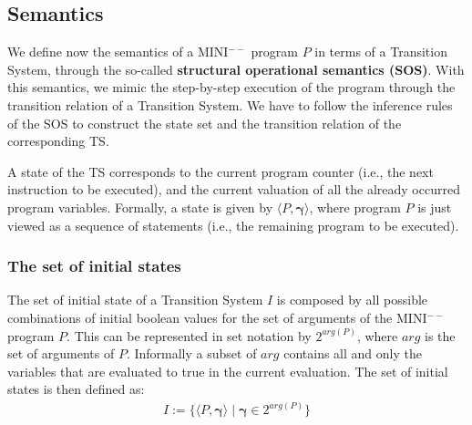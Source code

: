 \documentclass{article}
\begin{document}
\subsection{Semantics}
We define now the semantics of a MINI$^{--}$ program $P$ in terms of a Transition System, through the so-called \textbf{structural operational semantics (SOS)}. With this semantics, we mimic the step-by-step execution of the program through the transition relation of a Transition System. We have to follow the inference rules of the SOS to construct the state set and the transition relation of the corresponding TS.

A state of the TS corresponds to the current program counter (i.e., the next instruction to be executed), and the current valuation of all the already occurred program variables.
Formally, a state is given by $\langle P, \mathbf{\gamma} \rangle$, where program $P$ is just viewed as a sequence of statements (i.e., the remaining program to be executed). 

\subsubsection{The set of initial states}
The set of initial state of a Transition System $I$ is composed by all possible combinations of initial boolean values for the set of arguments of the MINI$^{--}$ program $P$. This can be represented in set notation by $2^{arg(P)}$, where $arg$ is the set of arguments of $P$. Informally a subset of $arg$ contains all and only the variables that are evaluated to true in the current evaluation. The set of initial states is then defined as:
\begin{align*}
    I := \{ \langle P, \mathbf{\gamma} \rangle \mid \mathbf{\gamma} \in 2^{arg(P)} \}
\end{align*}
\end{document}
